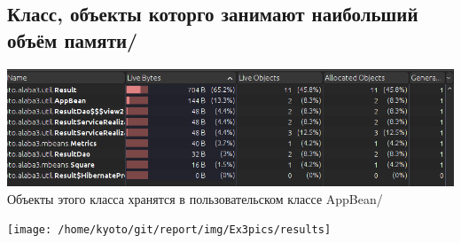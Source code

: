 \BgThispage

\subsection{Класс, объекты которго занимают наибольший объём памяти/}
\includegraphics[scale=0.5]{img/Ex3pics/ObjectsMemory}\\
Объекты этого класса хранятся в пользовательском классе AppBean/\par
\texttt{[image: /home/kyoto/git/report/img/Ex3pics/results]}
\vspace{2cm}
